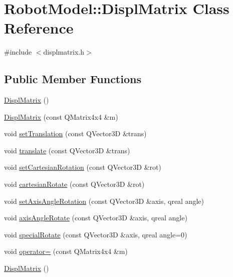 \hypertarget{class_robot_model_1_1_displ_matrix}{
\section{RobotModel::DisplMatrix Class Reference}
\label{class_robot_model_1_1_displ_matrix}
}


{\ttfamily \#include $<$displmatrix.h$>$}\subsection*{Public Member Functions}
\begin{DoxyCompactItemize}
\item 
\hyperlink{class_robot_model_1_1_displ_matrix_a97463ac04605597575600274a23109de}{DisplMatrix} ()
\item 
\hyperlink{class_robot_model_1_1_displ_matrix_a6934f8d81e8e5b9c8dbcc1d6fd68c560}{DisplMatrix} (const QMatrix4x4 \&m)
\item 
void \hyperlink{class_robot_model_1_1_displ_matrix_a9ea9b65326be614baea1ea86a2a1b258}{setTranslation} (const QVector3D \&trans)
\item 
void \hyperlink{class_robot_model_1_1_displ_matrix_ae9aa3671b52f8300ac2f11648fa1fddf}{translate} (const QVector3D \&trans)
\item 
void \hyperlink{class_robot_model_1_1_displ_matrix_a8654f5029974e0154c3c46ec2bb3dbe3}{setCartesianRotation} (const QVector3D \&rot)
\item 
void \hyperlink{class_robot_model_1_1_displ_matrix_a337c49b52435255a7f36966c7047f6ff}{cartesianRotate} (const QVector3D \&rot)
\item 
void \hyperlink{class_robot_model_1_1_displ_matrix_ab976907c6be66c0aee20a24991ce4159}{setAxisAngleRotation} (const QVector3D \&axis, qreal angle)
\item 
void \hyperlink{class_robot_model_1_1_displ_matrix_aaf591b95247e1a80332ba0033427af7e}{axisAngleRotate} (const QVector3D \&axis, qreal angle)
\item 
void \hyperlink{class_robot_model_1_1_displ_matrix_ac77a7ddd42d4a58251823c1fe06d65a2}{specialRotate} (const QVector3D \&axis, qreal angle=0)
\item 
void \hyperlink{class_robot_model_1_1_displ_matrix_a3baf235c0c2c7eee46506dc2b2114fe2}{operator=} (const QMatrix4x4 \&m)
\item 
\hyperlink{class_robot_model_1_1_displ_matrix_a4404a1a69859c9725090684813ea8c28}{DisplMatrix} ()
\item 

\end{DoxyCompactItemize}
